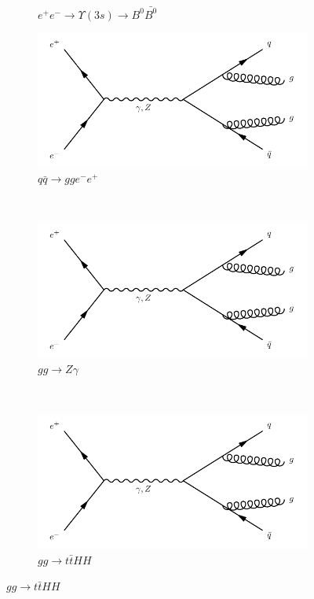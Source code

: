 \begin{figure}[h]
\begin{subfigure}[b]{0.3\textwidth}
    \caption{$e^+e^-\rightarrow \Upsilon(3s)\rightarrow B^0\bar{B^0}$}
    \label{fey:15}
  \end{subfigure}
  \newline
  \newline
  \begin{subfigure}[b]{0.3\textwidth}
    \includegraphics[width=\textwidth]{../Diagrams/D1.pdf}
    \caption{$q\bar{q}\rightarrow gge^-e^+$}
    \label{fey:16}
  \end{subfigure}
  ~
  \begin{subfigure}[b]{0.3\textwidth}
    \includegraphics[width=\textwidth]{../Diagrams/D1.pdf}
    \caption{$gg \rightarrow Z\gamma$}
    \label{fey:17}
  \end{subfigure}%
  ~
  \begin{subfigure}[b]{0.3\textwidth}
    \includegraphics[width=\textwidth]{../Diagrams/D1.pdf}
    \caption{$gg\rightarrow t\bar{t}HH$}
    \label{fey:18}
  \end{subfigure}%
\end{figure}
